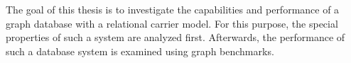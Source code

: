 The goal of this thesis is to investigate the capabilities and performance of a graph database with a relational carrier model. For this purpose, the special properties of such a system are analyzed first. Afterwards, the performance of such a database system is examined using graph benchmarks.